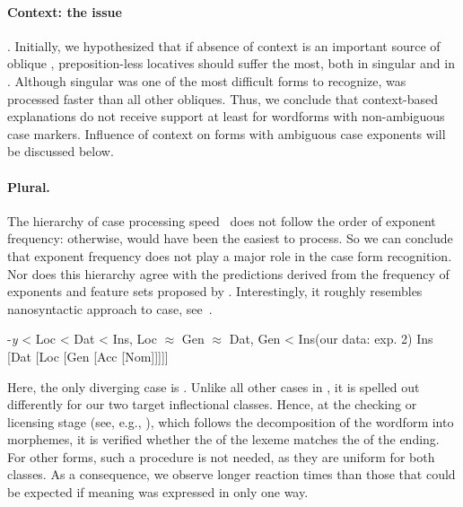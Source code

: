 \documentclass[output=paper, modfonts,newtxmath,hidelinks]{langscibook}
\begin{document}
\paragraph*{Context: the  issue}. Initially, we hypothesized that if absence of context is an important source of oblique , preposition-less locatives should suffer the most, both in singular and in . Although   singular was one of the most difficult forms to recognize,   was processed faster than all other obliques. Thus, we conclude that context-based explanations do not receive support at least for wordforms with non-ambiguous case markers. Influence of context on forms with ambiguous case exponents will be discussed below.\\

\paragraph*{Plural.} The hierarchy of  case processing speed~ does not follow the order of exponent frequency: otherwise,  would have been the easiest to process. So we can conclude that exponent frequency does not play a major role in the case form recognition. Nor does this hierarchy agree with the predictions derived from the frequency of exponents and feature sets proposed by \citet{muller2004decomposing, wiese2004categories, wunderlich2004there}. Interestingly, it roughly resembles  nanosyntactic approach to  case, see~.

\ea \ea	\label{ex:plHierarchy} -\textit{y} < Loc < Dat < Ins, Loc $\approx$ Gen $\approx$ Dat, Gen < Ins\hfill (our data: exp. 2)
    \ex \label{ex:cahafunc} \ob Ins [Dat [Loc [Gen [Acc [Nom]]]]]\cb
    \z 
\z

\noindent Here, the only diverging case is . Unlike all other cases in , it is spelled out differently for our two target inflectional classes. Hence, at the checking or licensing stage (see, e.g., \citealt{bertram2000role}), which follows the decomposition of the wordform into morphemes,  it is verified whether the  of the lexeme matches the  of the ending. For other  forms, such a procedure is not needed, as they are uniform for both classes. As a consequence, we observe longer reaction times than those that could be expected if   meaning was expressed in only one way.
\end{document}

